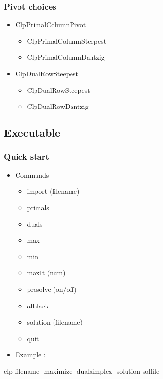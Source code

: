 \documentclass{beamer}
\begin{document}
{\Large
\begin{frame}
  \frametitle{Pivot choices}
  \begin{itemize}
  \item ClpPrimalColumnPivot
    {\Large
    \begin{itemize}
    \item ClpPrimalColumnSteepest
    \item ClpPrimalColumnDantzig
    \end{itemize}
    }
  \item ClpDualRowSteepest
    {\Large
    \begin{itemize}
    \item ClpDualRowSteepest
    \item ClpDualRowDantzig
    \end{itemize}
    }
  \end{itemize}
\end{frame}
}

\subsection{Executable}

\begin{frame}
\frametitle{Quick start}
\begin{itemize}
\item Commands
\begin{itemize}
\item import (filename)
\item primals
\item duals
\item max
\item min
\item maxIt (num)
\item presolve (on/off)
\item allslack
\item solution (filename)
\item quit
\end{itemize}
\end{itemize}
\begin{itemize}
\item Example :
\end{itemize}
clp filename -maximize -dualsimplex -solution solfile
\end{frame}

\end{document}
